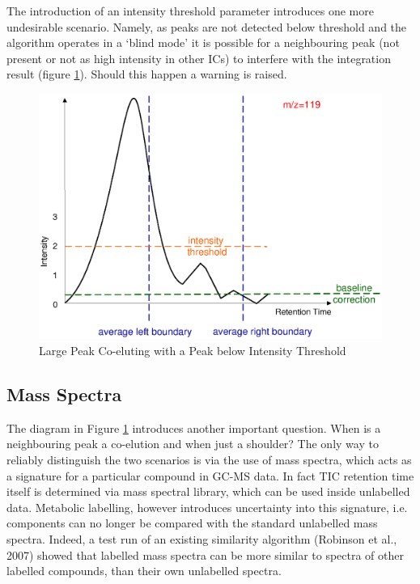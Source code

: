 The introduction of an intensity threshold parameter introduces one more 
undesirable scenario. Namely, as peaks are not detected below threshold and the 
algorithm operates in a ‘blind mode’ it is possible for a neighbouring peak 
(not present or not as high intensity in other ICs) to interfere with the 
integration result (figure \ref{fig:89}). Should this happen a warning is raised.

\begin{figure}
  \begin{center}
    \includegraphics[scale=0.7]{graphics/chapter08/89.eps}
  \end{center}
  \caption{Large Peak Co-eluting with a Peak below Intensity Threshold}
  \label{fig:89}
\end{figure}

\subsection
{Mass Spectra}

The diagram in Figure \ref{fig:89} introduces another important question. 
When is a neighbouring peak a co-elution and when just a shoulder? The only way 
to reliably distinguish the two scenarios is via the use of mass spectra, which 
acts as a signature for a particular compound in GC-MS data. In fact TIC 
retention time itself is determined via mass spectral library, which can be 
used inside unlabelled data. Metabolic labelling, however introduces uncertainty 
into this signature, i.e. components can no longer be compared with the standard 
unlabelled mass spectra. Indeed, a test run of an existing similarity algorithm 
(Robinson et al., 2007) showed that labelled mass spectra can be more similar 
to spectra of other labelled compounds, than their own unlabelled spectra.

